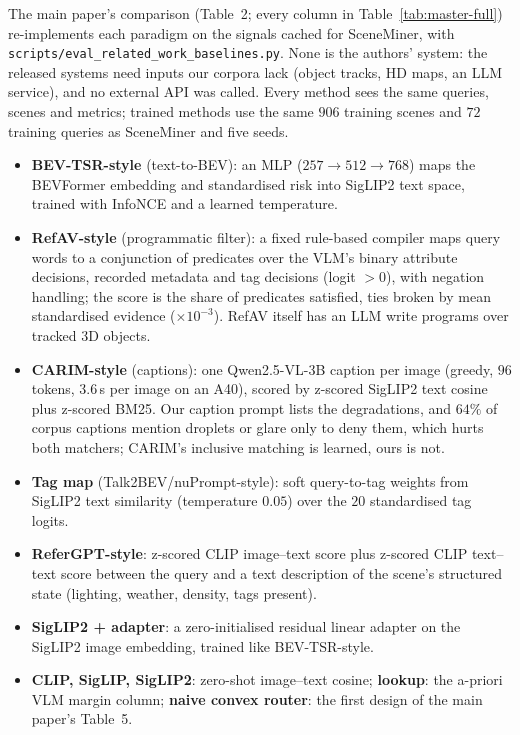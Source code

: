 \documentclass[10pt,letterpaper]{article}
\begin{document}
The main paper's comparison (Table~2; every column in Table~\ref{tab:master-full})
re-implements each paradigm on the signals cached for SceneMiner, with
\texttt{scripts/eval\_related\_work\_baselines.py}. None is the authors' system: the released
systems need inputs our corpora lack (object tracks, HD maps, an LLM service),
and no external API was called. Every method sees the same queries, scenes and
metrics; trained methods use the same $906$ training scenes and $72$ training
queries as SceneMiner and five seeds.
\begin{itemize}\setlength{\itemsep}{1pt}
\item \textbf{BEV-TSR-style} (text-to-BEV): an MLP ($257\to512\to768$) maps the
  BEVFormer embedding and standardised risk into SigLIP2 text space, trained with
  InfoNCE and a learned temperature.
\item \textbf{RefAV-style} (programmatic filter): a fixed rule-based compiler maps
  query words to a conjunction of predicates over the VLM's binary attribute
  decisions, recorded metadata and tag decisions (logit $>0$), with negation
  handling; the score is the share of predicates satisfied, ties broken by mean
  standardised evidence ($\times10^{-3}$). RefAV itself has an LLM write programs
  over tracked 3D objects.
\item \textbf{CARIM-style} (captions): one Qwen2.5-VL-3B caption per image (greedy,
  $96$ tokens, $3.6$\,s per image on an A40), scored by z-scored SigLIP2 text
  cosine plus z-scored BM25. Our caption prompt lists the degradations, and $64\%$
  of corpus captions mention droplets or glare only to deny them, which hurts
  both matchers; CARIM's inclusive matching is learned, ours is not.
\item \textbf{Tag map} (Talk2BEV/nuPrompt-style): soft query-to-tag weights from
  SigLIP2 text similarity (temperature $0.05$) over the $20$ standardised tag
  logits.
\item \textbf{ReferGPT-style}: z-scored CLIP image--text score plus z-scored CLIP
  text--text score between the query and a text description of the scene's
  structured state (lighting, weather, density, tags present).
\item \textbf{SigLIP2 + adapter}: a zero-initialised residual linear adapter on the
  SigLIP2 image embedding, trained like BEV-TSR-style.
\item \textbf{CLIP, SigLIP, SigLIP2}: zero-shot image--text cosine; \textbf{lookup}:
  the a-priori VLM margin column; \textbf{naive convex router}: the first design
  of the main paper's Table~5.
\end{itemize}
\end{document}
